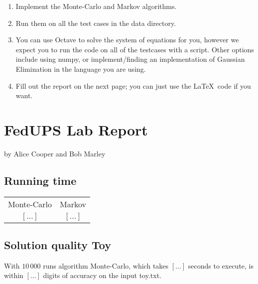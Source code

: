 \documentclass{tufte-handout}
\begin{document}
\begin{enumerate}
\item Implement the Monte-Carlo and Markov algorithms.
\item Run them on all the test cases in the data directory.
\item You can use Octave to solve the system of equations for you, 
    however we expect you to run the code on all of the testcases with a script.
    Other options include using numpy, or implement/finding an implementation of
        Gaussian Elimination in the language you are using.
\item Fill out the report on the next page; you can just use the
  \LaTeX\ code if you want.
\end{enumerate}

\newpage


\newpage
\section{FedUPS Lab Report}


by Alice Cooper and Bob Marley

\subsection{Running time}

\begin{tabular}{ c c }
    Monte-Carlo & Markov \\ 
    $[\ldots]$ & $[\ldots]$  
\end{tabular}




\subsection{Solution quality Toy}

With $10\,000$ runs algorithm Monte-Carlo, which takes $[\ldots]$ seconds to execute, is within $[\ldots]$ digits of accuracy on the input toy.txt.
\end{document}
